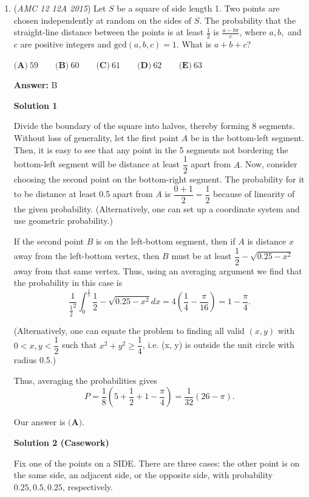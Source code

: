\begin{enumerate}
 


	\item (\textit{AMC 12 12A 2015}) Let $S$ be a square of side length 1. Two points are chosen independently at random on the sides of $S$. The probability that the straight-line distance between the points is at least $\frac12$ is $\frac{a-b\pi}{c}$, where $a,b,$ and $c$ are positive integers and $\text{gcd}(a,b,c) = 1$. What is $a+b+c$?


 $\textbf{(A)}\ 59 \qquad\textbf{(B)}\ 60 \qquad\textbf{(C)}\ 61 \qquad\textbf{(D)}\ 62 \qquad\textbf{(E)}\ 63$

 \textbf{Answer: }B



\textbf{Solution 1}

Divide the boundary of the square into halves, thereby forming 8 segments. Without loss of generality, let the first point $A$ be in the bottom-left segment. Then, it is easy to see that any point in the 5 segments not bordering the bottom-left segment will be distance at least $\dfrac{1}{2}$ apart from $A$. Now, consider choosing the second point on the bottom-right segment. The probability for it to be distance at least 0.5 apart from $A$ is $\dfrac{0 + 1}{2} = \dfrac{1}{2}$ because of linearity of the given probability. (Alternatively, one can set up a coordinate system and use geometric probability.)

 If the second point $B$ is on the left-bottom segment, then if $A$ is distance $x$ away from the left-bottom vertex, then $B$ must be at least $\dfrac{1}{2} - \sqrt{0.25 - x^2}$ away from that same vertex. Thus, using an averaging argument we find that the probability in this case is
 \[\frac{1}{\frac{1}{2}^2} \int_0^{\frac{1}{2}} \dfrac{1}{2} - \sqrt{0.25 - x^2} dx = 4\left(\frac{1}{4} - \frac{\pi}{16}\right) = 1 - \frac{\pi}{4}.\]

 (Alternatively, one can equate the problem to finding all valid $(x, y)$ with $0 < x, y < \dfrac{1}{2}$  such that $x^2 + y^2 \ge \dfrac{1}{4}$, i.e. (x, y) is outside the unit circle with radius 0.5.)

 Thus, averaging the probabilities gives
 \[P = \frac{1}{8} \left(5 + \frac{1}{2} + 1 - \frac{\pi}{4}\right) = \frac{1}{32} (26 - \pi).\]

 Our answer is $\textbf{(A)}$.

 



\textbf{Solution 2 (Casework)}

Fix one of the points on a SIDE. There are three cases: the other point is on the same side, an adjacent side, or the opposite side, with probability $0.25, 0.5, 0.25$, respectively.


\end{enumerate}
